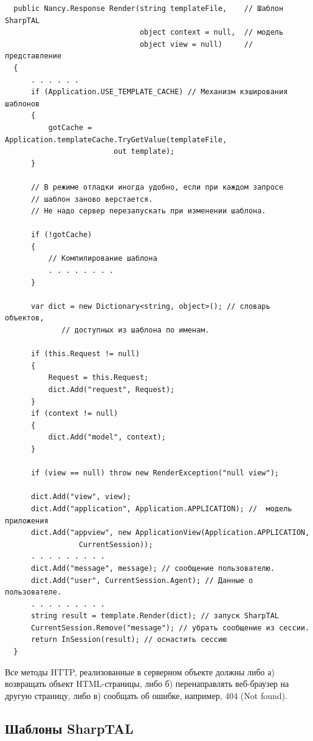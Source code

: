\documentclass[a4paper,14pt,openany,final]{extreport} %
\begin{document}
{\begin{verbatim}
  public Nancy.Response Render(string templateFile,    // Шаблон SharpTAL
                               object context = null,  // модель
                               object view = null)     // представление
  {
      . . . . . .
      if (Application.USE_TEMPLATE_CACHE) // Механизм кэширования шаблонов
      {
          gotCache = Application.templateCache.TryGetValue(templateFile,
                         out template);
      }

      // В режиме отладки иногда удобно, если при каждом запросе
      // шаблон заново верстается.
      // Не надо сервер перезапускать при изменении шаблона.

      if (!gotCache)
      {
          // Компилирование шаблона
          . . . . . . . .
      }

      var dict = new Dictionary<string, object>(); // словарь объектов,
             // доступных из шаблона по именам.

      if (this.Request != null)
      {
          Request = this.Request;
          dict.Add("request", Request);
      }
      if (context != null)
      {
          dict.Add("model", context);
      }

      if (view == null) throw new RenderException("null view");

      dict.Add("view", view);
      dict.Add("application", Application.APPLICATION); //  модель приложения
      dict.Add("appview", new ApplicationView(Application.APPLICATION,
                 CurrentSession));
      . . . . . . . . .
      dict.Add("message", message); // сообщение пользователю.
      dict.Add("user", CurrentSession.Agent); // Данные о пользователе.
      . . . . . . . . .
      string result = template.Render(dict); // запуск SharpTAL
      CurrentSession.Remove("message"); // убрать сообщение из сессии.
      return InSession(result); // оснастить сессию
  }
\end{verbatim}

Все методы HTTP, реализованные в серверном объекте должны либо а) возвращать объект HTML-страницы, либо б) перенаправлять веб-браузер на другую страницу, либо в) сообщать об ошибке, например, 404 (\foreignlanguage{english}{Not found}).

\subsection{Шаблоны SharpTAL}

}
\end{document}
